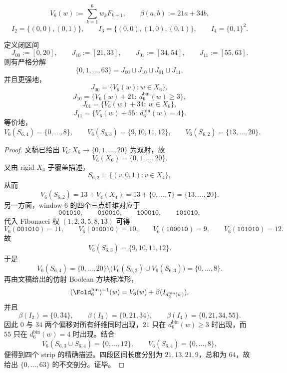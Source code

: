 \[
V_6(w):=\sum_{k=1}^{6}w_kF_{k+1},
\qquad
\beta(a,b):=21a+34b,
\]
\[
I_2=\{(0,0),(0,1)\},
\qquad
I_3=\{(0,0),(1,0),(0,1)\},
\qquad
I_4=\{0,1\}^2.
\]

\begin{theorem}\label{thm:conclusion-window6-hidden-strip-fourlayer-partition}
定义闭区间
\[
J_{00}:=[0,20],
\qquad
J_{10}:=[21,33],
\qquad
J_{01}:=[34,54],
\qquad
J_{11}:=[55,63].
\]
则有严格分解
\[
\{0,1,\dots,63\}=J_{00}\sqcup J_{10}\sqcup J_{01}\sqcup J_{11},
\]
并且更强地，
\[
J_{00}=\{V_6(w):w\in X_6\},
\]
\[
J_{10}=\{V_6(w)+21:\ d_6^{\mathrm{bin}}(w)\ge 3\},
\]
\[
J_{01}=\{V_6(w)+34:\ w\in X_6\},
\]
\[
J_{11}=\{V_6(w)+55:\ d_6^{\mathrm{bin}}(w)=4\}.
\]
等价地，
\[
V_6(S_{6,4})=\{0,\dots,8\},
\qquad
V_6(S_{6,3})=\{9,10,11,12\},
\qquad
V_6(S_{6,2})=\{13,\dots,20\}.
\]
\end{theorem}
\begin{proof}
文稿已给出 \(V_6:X_6\to\{0,1,\dots,20\}\) 为双射，故
\[
V_6(X_6)=\{0,1,\dots,20\}.
\]
又由 rigid \(X_4\) 子覆盖描述，
\[
S_{6,2}=\{(v,0,1):v\in X_4\},
\]
从而
\[
V_6(S_{6,2})=13+V_4(X_4)=13+\{0,\dots,7\}=\{13,\dots,20\}.
\]
另一方面，window-\(6\) 的四个三点纤维对应于
\[
\texttt{001010},\qquad
\texttt{010010},\qquad
\texttt{100010},\qquad
\texttt{101010},
\]
代入 Fibonacci 权 \((1,2,3,5,8,13)\) 可得
\[
V_6(\texttt{001010})=11,\qquad
V_6(\texttt{010010})=10,\qquad
V_6(\texttt{100010})=9,\qquad
V_6(\texttt{101010})=12.
\]
故
\[
V_6(S_{6,3})=\{9,10,11,12\}.
\]
于是
\[
V_6(S_{6,4})
=
\{0,\dots,20\}\setminus\bigl(V_6(S_{6,2})\cup V_6(S_{6,3})\bigr)
=
\{0,\dots,8\}.
\]
再由文稿给出的仿射 Boolean 方块标准形，
\[
(\Fold_6^{\mathrm{bin}})^{-1}(w)=V_6(w)+\beta(I_{d_6^{\mathrm{bin}}(w)}),
\]
并且
\[
\beta(I_2)=\{0,34\},
\qquad
\beta(I_3)=\{0,21,34\},
\qquad
\beta(I_4)=\{0,21,34,55\}.
\]
因此 \(0\) 与 \(34\) 两个偏移对所有纤维同时出现，\(21\) 只在 \(d_6^{\mathrm{bin}}(w)\ge 3\) 时出现，而 \(55\) 只在 \(d_6^{\mathrm{bin}}(w)=4\) 时出现。结合
\[
V_6(S_{6,3}\cup S_{6,4})=\{0,\dots,12\},
\qquad
V_6(S_{6,4})=\{0,\dots,8\},
\]
便得到四个 strip 的精确描述。四段区间长度分别为 \(21,13,21,9\)，总和为 \(64\)，故给出 \(\{0,\dots,63\}\) 的不交剖分。证毕。
\end{proof}

